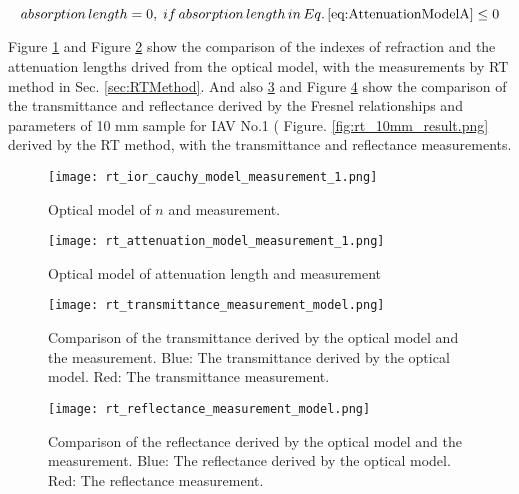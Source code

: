 \begin{equation}
\label{eq:AttenuationModelB}
absorption\,length = 0,\;if\,absorption\,length\,in\,Eq.\,\ref{eq:AttenuationModelA}\leq0
\end{equation}


Figure \ref{fig:rt_ior_cauchy_model_measurement_1} and Figure \ref{fig:rt_attenuation_model_measurement_1} show the comparison of the indexes of refraction and the attenuation lengths drived from the
optical model, with the measurements by RT method in Sec. \ref{sec:RTMethod}.
And also \ref{fig:rt_transmittance_measurement_model} and Figure \ref{fig:rt_reflectance_measurement_model} show the comparison of the transmittance
and reflectance derived by the Fresnel relationships and parameters
of 10 mm sample for IAV No.1 ( Figure. \ref{fig:rt_10mm_result.png}
derived by the RT method, with the transmittance and reflectance measurements.




\begin{figure}
    \centering
    \texttt{[image: rt\_ior\_cauchy\_model\_measurement\_1.png]}
    \caption[Optical model of $n$ and measurement]{Optical model of $n$ and measurement.}
    \label{fig:rt_ior_cauchy_model_measurement_1}
    \end{figure}



\begin{figure}
    \centering
    \texttt{[image: rt\_attenuation\_model\_measurement\_1.png]}
    \caption[Optical model of attenuation length and measurement]{Optical model of attenuation length and measurement}
    \label{fig:rt_attenuation_model_measurement_1}
    \end{figure}


\begin{figure}
    \centering
    \texttt{[image: rt\_transmittance\_measurement\_model.png]}
    \caption[Comparison of the transmittance derived by the optical model and the measurement]
{
Comparison of the transmittance derived by the optical model and the measurement.
Blue: The transmittance derived by the optical model.
Red: The transmittance measurement.
}
    \label{fig:rt_transmittance_measurement_model}
    \end{figure}


\begin{figure}
    \centering
    \texttt{[image: rt\_reflectance\_measurement\_model.png]}
    \caption[Comparison of the reflectance derived by the optical model and the measurement.]
{
Comparison of the reflectance derived by the optical model and the measurement.
Blue: The reflectance derived by the optical model.
Red: The reflectance measurement.
}
    \label{fig:rt_reflectance_measurement_model}
    \end{figure}



